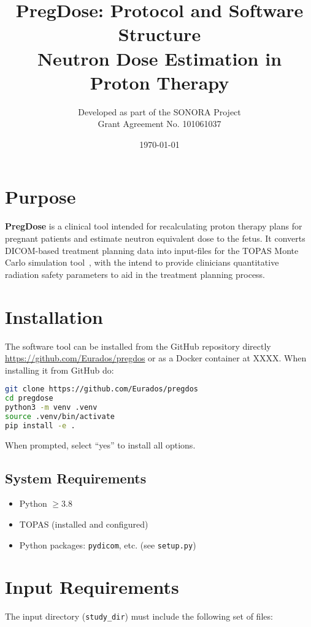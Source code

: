 \documentclass[11pt]{article}
\title{\textbf{PregDose: Protocol and Software Structure}\\Neutron Dose Estimation in Proton Therapy}
\author{Developed as part of the SONORA Project \\ Grant Agreement No. 101061037}
\date{\today}
\begin{document}
\maketitle

\section{Purpose}

\textbf{PregDose} is a clinical tool intended for recalculating proton therapy plans for pregnant patients and estimate neutron equivalent dose to the fetus. It converts DICOM-based treatment planning data into input-files for the TOPAS Monte Carlo simulation tool~\cite{perl_topas_2012}, with the intend to provide clinicians quantitative radiation safety parameters to aid in the treatment planning process. 

\section{Installation}
The software tool can be installed from the GitHub repository directly \url{https://github.com/Eurados/pregdos} or as a Docker container at XXXX. When installing it from GitHub do:
\begin{lstlisting}[language=bash]
git clone https://github.com/Eurados/pregdos
cd pregdose
python3 -m venv .venv
source .venv/bin/activate
pip install -e .
\end{lstlisting}

When prompted, select ``yes'' to install all options.


\subsection{System Requirements}
\begin{itemize}
    \item Python $\geq 3.8$
    \item TOPAS (installed and configured)
    \item Python packages: \texttt{pydicom}, etc. (see \texttt{setup.py})
\end{itemize}

\section{Input Requirements}

The input directory (\texttt{study\_dir}) must include the following set of files:
\end{document}
